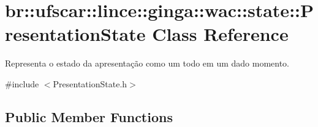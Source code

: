 \hypertarget{classbr_1_1ufscar_1_1lince_1_1ginga_1_1wac_1_1state_1_1PresentationState}{
\section{br::ufscar::lince::ginga::wac::state::PresentationState Class Reference}
\label{classbr_1_1ufscar_1_1lince_1_1ginga_1_1wac_1_1state_1_1PresentationState}
}


Representa o estado da apresentação como um todo em um dado momento.  


{\ttfamily \#include $<$PresentationState.h$>$}\subsection*{Public Member Functions}
